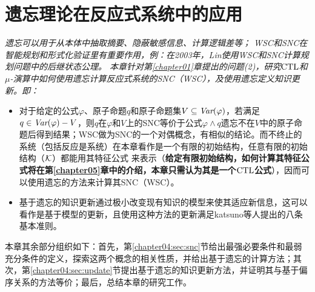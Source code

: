 
\chapter{遗忘理论在反应式系统中的应用}
\label{chapter04}

{\em
遗忘可以用于从本体中抽取摘要、隐蔽敏感信息、计算逻辑差等；
WSC和SNC在智能规划和形式化验证里有重要作用，例：在2003年，Lin使用WSC和SNC计算规划问题中的后继状态公理。
本章针对第\ref{chapter01}章提出的问题(2)，研究$\textrm{CTL}$和$\mu$-演算中如何使用遗忘计算反应式系统的SNC（WSC），及使用遗忘定义知识更新。即：
\begin{itemize}
	\item 对于给定的公式$\varphi$、原子命题$q$和原子命题集$V\subseteq \textit{Var}(\varphi)$，若满足$q \in \textit{Var}(\varphi)-V$，则$q$在$\varphi$和$V$上的SNC等价于公式$\varphi \wedge q$遗忘不在$V$中的原子命题后得到结果；WSC做为SNC的一个对偶概念，有相似的结论。而不终止的系统（包括反应是系统）在本章看作是一个有限的初始结构，任意有限的初始结构（${\cal K}$）都能用其特征公式%
	来表示（\textbf{给定有限初始结构，如何计算其特征公式将在第\ref{chapter05}章中的介绍，本章只需认为其是一个$\textrm{CTL}$公式}），因而可以使用遗忘的方法来计算其SNC（WSC）。
	\item 基于遗忘的知识更新通过极小改变现有知识的模型来使其适应新信息，这可以看作是基于模型的更新，且使用这种方法的更新满足katsuno等人提出的八条基本准则\cite{katsuno91mendelzon}。
\end{itemize}


本章其余部分组织如下：首先，第\ref{chapter04:sec:snc}节给出最强必要条件和最弱充分条件的定义，探索这两个概念的相关性质，并给出基于遗忘的计算方法；其次，第\ref{chapter04:sec:update}节提出基于遗忘的知识更新方法，并证明其与基于偏序关系的方法等价；最后，总结本章的研究工作。}

